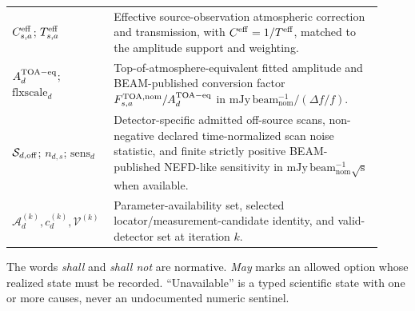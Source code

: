 \begin{longtable}{L{0.22\linewidth}L{0.70\linewidth}}
$C^{\rm eff}_{s,a}$; $T^{\rm eff}_{s,a}$ & Effective source-observation atmospheric correction and transmission, with $C^{\rm eff}=1/T^{\rm eff}$, matched to the amplitude support and weighting. \\
$A_d^{\rm TOA-eq}$; $\mathrm{flxscale}_d$ & Top-of-atmosphere-equivalent fitted amplitude and BEAM-published conversion factor $F^{\rm TOA,nom}_{s,a}/A_d^{\rm TOA-eq}$ in $\mathrm{mJy\,beam_{nom}^{-1}}/(\Delta f/f)$. \\
$\mathcal S_{d,\rm off}$; $n_{d,s}$; $\mathrm{sens}_d$ & Detector-specific admitted off-source scans, non-negative declared time-normalized scan noise statistic, and finite strictly positive BEAM-published NEFD-like sensitivity in $\mathrm{mJy\,beam_{nom}^{-1}\sqrt{s}}$ when available. \\
$\mathcal A_d^{(k)},c_d^{(k)},\mathcal V^{(k)}$ & Parameter-availability set, selected locator/measurement-candidate identity, and valid-detector set at iteration $k$. \\
\bottomrule
\end{longtable}

The words \emph{shall} and \emph{shall not} are normative. \emph{May} marks
an allowed option whose realized state must be recorded. ``Unavailable'' is a
typed scientific state with one or more causes, never an undocumented numeric
sentinel.
\normalsize
